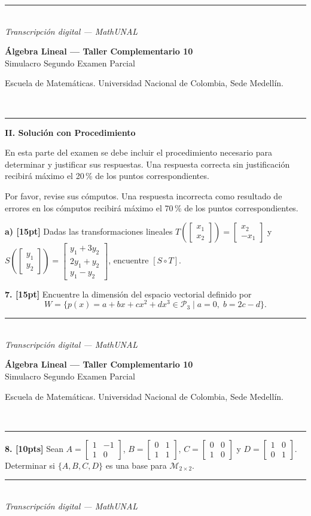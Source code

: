 \documentclass[11pt]{article}
\newcommand{\examheader}{%
  \noindent
  \begin{minipage}[t]{0.6\linewidth}
    {\small\bfseries Álgebra Lineal --- Taller Complementario 10}\\
    {\small Simulacro Segundo Examen Parcial}
  \end{minipage}%
  \hfill
  \begin{minipage}[t]{0.35\linewidth}
    \raggedleft\small Escuela de Matemáticas. Universidad Nacional de Colombia, Sede Medellín.
  \end{minipage}\\[2pt]
  \rule{\linewidth}{0.6pt}
}
\newcommand{\examfooter}{%
  \vfill
  \rule{\linewidth}{0.4pt}\\[1pt]
  {\scriptsize\textit{Transcripción digital --- MathUNAL}\hfill\textcolor{unalblue}{\textbf{\thepage}}}
}
\begin{document}
\examfooter
\newpage

\examheader

\noindent\textbf{II. Solución con Procedimiento}\\
{\small En esta parte del examen se debe incluir el procedimiento necesario para determinar y justificar sus respuestas. Una respuesta correcta sin justificación recibirá máximo el 20\,\% de los puntos correspondientes.

Por favor, revise sus cómputos. Una respuesta incorrecta como resultado de errores en los cómputos recibirá máximo el 70\,\% de los puntos correspondientes.}

\vspace{0.4cm}

\textbf{a) [15pt]} Dadas las transformaciones lineales $T\left(\begin{bmatrix}x_1\\x_2\end{bmatrix}\right) = \begin{bmatrix}x_2\\-x_1\end{bmatrix}$ y $S\left(\begin{bmatrix}y_1\\y_2\end{bmatrix}\right) = \begin{bmatrix}y_1+3y_2\\2y_1+y_2\\y_1-y_2\end{bmatrix}$, encuentre $[S\circ T]$.

\vspace{2cm}

\textbf{7. [15pt]} Encuentre la dimensión del espacio vectorial definido por
\[
W = \{ p(x) = a+bx+cx^2+dx^3 \in \mathcal{P}_3 \mid a=0,\; b=2c-d \}.
\]

\examfooter
\newpage

\examheader

\textbf{8. [10pts]} Sean $A = \begin{bmatrix}1&-1\\1&0\end{bmatrix}$, $B = \begin{bmatrix}0&1\\1&1\end{bmatrix}$, $C = \begin{bmatrix}0&0\\1&0\end{bmatrix}$ y $D = \begin{bmatrix}1&0\\0&1\end{bmatrix}$. Determinar si $\{A,B,C,D\}$ es una base para $\mathcal{M}_{2\times 2}$.

\examfooter
\end{document}
